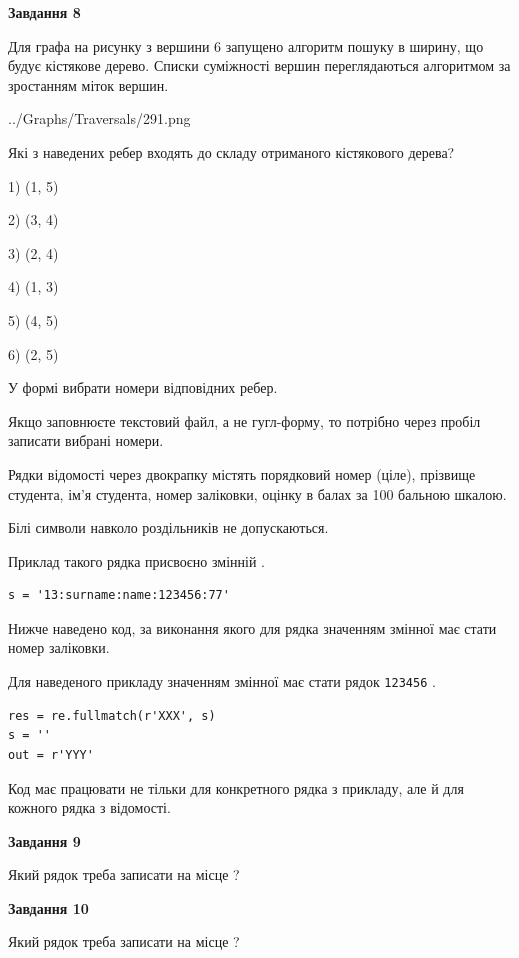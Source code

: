 \documentclass[12pt, ukrainian]{article}
\def\code#1{\Verb!#1!}
\begin{document}
{\begin {large}
{\begin {center}\textbf{Завдання 8}\end {center}}\par
Для графа на рисунку з вершини 6 запущено алгоритм пошуку в ширину, що будує кістякове дерево. Списки суміжності вершин переглядаються алгоритмом за зростанням міток вершин.\par
\begin{center}
	{../Graphs/Traversals/291.png}
\end{center}
\par Які з наведених ребер входять до складу отриманого кістякового дерева?\par
1) (1, 5)\par
2) (3, 4)\par
3) (2, 4)\par
4) (1, 3)\par
5) (4, 5)\par
6) (2, 5)\par
{\vskip 15pt} У формі вибрати номери відповідних ребер.


Якщо заповнюєте текстовий файл, а не гугл-форму, то потрібно через пробіл записа\-ти вибрані номери.\par
\newpage


Рядки відомості через двокрапку містять порядковий номер (ціле), пріз\-ви\-ще студен\-та, ім'я студента, номер заліковки, оцінку в балах за 100 бальною шкалою.

Білі символи навколо роздільників не допускаються.

Приклад такого рядка присвоєно змінній .



\begin{verbatim}
s = '13:surname:name:123456:77'
\end{verbatim}


Нижче наведено код, за виконання якого для рядка  значенням змінної  має стати номер заліковки.

Для наведеного прикладу значенням змінної  має стати рядок \code{123456} .



\begin{verbatim}
res = re.fullmatch(r'XXX', s)
s = ''
out = r'YYY'
\end{verbatim}


Код має працювати не тільки для конкретного рядка з прикладу, але й для кожного рядка з відомості.

{\begin {center}\textbf{Завдання 9}\end {center}}\par
Який рядок треба записати на місце  ?\par
\vspace{5mm}


{\begin {center}\textbf{Завдання 10}\end {center}}\par
Який рядок треба записати на місце  ?\par


\newpage


\end {large}}
\end{document}
